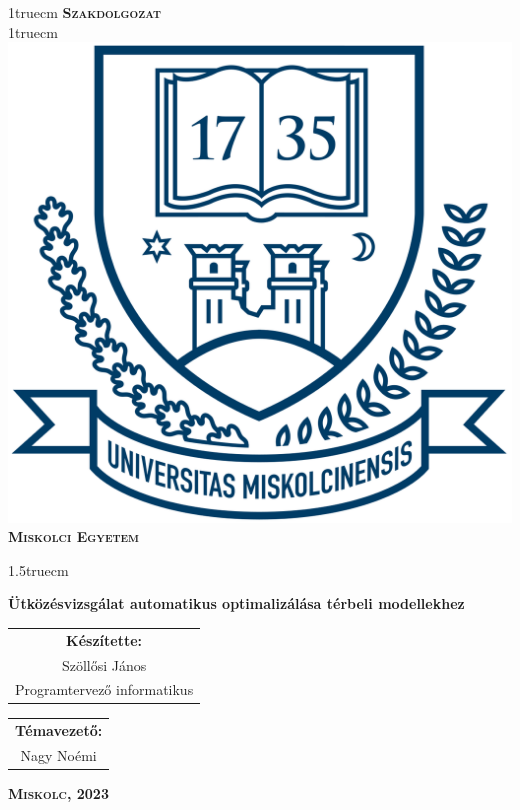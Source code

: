 \pagestyle{empty}

{\large
\begin{center}
\vglue 1truecm
\textbf{\huge\textsc{Szakdolgozat}}\\
\vglue 1truecm
\includegraphics[width=4.8truecm, height=4truecm]{images/me_logo.png}\\
\textbf{\textsc{Miskolci Egyetem}}
\end{center}}

\vglue 1.5truecm


{\LARGE
\begin{center}
\textbf{Ütközésvizsgálat automatikus optimalizálása térbeli modellekhez}
\end{center}}

\vspace*{2.5truecm}
{\large
\begin{center}
\begin{tabular}{c}
\textbf{Készítette:}\\
Szöllősi János\\
Programtervező informatikus
\end{tabular}
\end{center}
\begin{center}
\begin{tabular}{c}
\textbf{Témavezető:}\\
Nagy Noémi
\end{tabular}
\end{center}}
\vfill
{\large
\begin{center}
\textbf{\textsc{Miskolc, 2023}}
\end{center}}

\newpage
